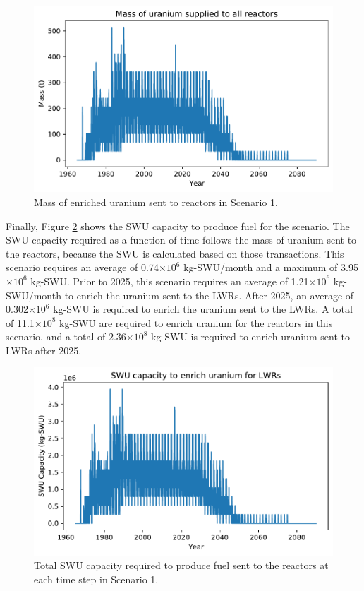 \begin{figure}
    \centering 
    \includegraphics[width=\textwidth]{../figures/fuelsupply_scenarios_1.pdf}
    \caption{Mass of enriched uranium sent to reactors in Scenario 1.}
    \label{fig:fuel_1}
\end{figure}

Finally, Figure \ref{fig:swu_1} shows the \gls{SWU} capacity to produce 
fuel for the scenario. The \gls{SWU} capacity required as a function of 
time follows the mass of uranium sent to the reactors, because the \gls{SWU}
is calculated based on those transactions. This scenario requires an 
average of 0.74$\times 10^6$ kg-\gls{SWU}/month and a maximum of 
3.95$\times 10^6$ kg-\gls{SWU}. Prior to 2025, this scenario requires 
an average of 1.21$\times 10^6$ kg-\gls{SWU}/month to enrich the uranium 
sent to the \glspl{LWR}.
After 2025, an average of 0.302$\times 10^6$ kg-\gls{SWU} is required to 
enrich the uranium sent to the \glspl{LWR}.
A total of 11.1$\times 10^8$ kg-SWU are required to enrich uranium for the 
reactors in this scenario, and a total of 2.36$\times 10^8$ kg-SWU is required 
to enrich uranium sent to \glspl{LWR} after 2025. 

\begin{figure}
    \centering
    \includegraphics[width=\textwidth]{../figures/totalswu_scenarios_1.pdf}
    \caption{Total \gls{SWU} capacity required to produce fuel sent to the 
    reactors at each time step in Scenario 1.}
    \label{fig:swu_1}
\end{figure}

